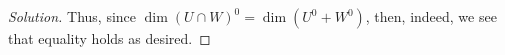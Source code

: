 \documentclass{article}
\newenvironment{solution}{\begin{proof}[Solution]}{\end{proof}}
\begin{document}
\begin{solution}
		Thus, since $\dim (U \cap W)^{0} = \dim (U^{0} + W^{0})$, then, indeed, we see that equality holds as desired.
		\begin{comment}
			Then, we note that for $$U^{0} + W^{0}$ consists of $\span(\varphi, \psi)$$
	
		Next, we note that $(U \cap W)^{0}$ consists of all $\gamma \in V'$ such that $\gamma(v) = 0$ for all $v \in U \cap W$. Since $v \in U \cap W$, this means then that $v \in U$ and $v \in W$; thus, we see that $\gamma \in U^{0}$ and $\gamma \in W^{0}$. This means then that every $\gamma \in (U \cap W)^{0}$ must then also be within $U^{0}$ and $W^{0}$.
		
		So, we have
		\begin{equation*}
			(U \cap W)^{0} \subseteq U^{0} + W^{0}.
		\end{equation*}
	
		Now, we will show that
		\begin{equation*}
			(U \cap W)^{0} \supseteq U^{0} + W^{0},
		\end{equation*}
		and thus can conclude that they are in fact equal.
		
		To do this, we first observe that since $V$ is some finite-dimensional vector space, its subspaces $U, W$ are also finite-dimensional. Furthermore, we recall that
		\begin{equation*}
			\dim (U + W) = \dim U + \dim W - \dim (U \cap W).
		\end{equation*}
	
		Then, we have:
		\begin{align*}
			\dim (U^{0} + W^{0}) &= \dim U^{0} + \dim W^{0} - \dim (U^{0} \cap W^{0}) \\
			&= 
			
			\dim V - \dim (U + W) \\
			&= \dim V - (\dim U + \dim W - \dim (U \cap W)) \\
			&= \dim V - \dim U - \dim W + \dim (U \cap W)
		\end{align*}
	
		Now, we observe that
		\begin{align*}
			\dim (U + W) &= \dim U + \dim W - \dim (U \cap W) \\
			\dim (U \cap W) &= \dim U + \dim W - \dim (U+W)
		\end{align*}
	
		Then, we observe the following:
		\begin{align*}
			\dim (U \cap W)^{0} &= \dim V - \dim (U \cap W) \\
			&= \dim V - (\dim U + \dim W - \dim (U + W)) \\
			&= \dim V - \dim U - \dim W + \dim (U + W) 
		\end{align*}
	

\end{comment}
\end{solution}
\end{document}
